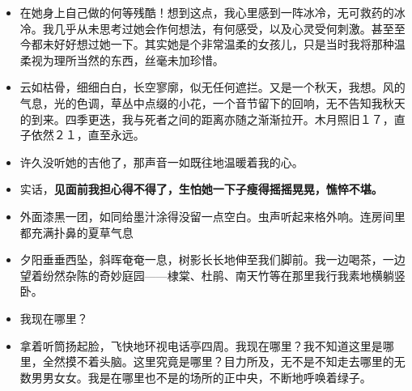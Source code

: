 \documentclass[UTF8,a4paper,8pt]{ctexart}
\begin{document}
\begin{itemize}
 	\item 在她身上自己做的何等残酷！想到这点，我心里感到一阵冰冷，无可救药的冰冷。我几乎从未思考过她会作何想法，有何感受，以及心灵受何刺激。甚至至今都未好好想过她一下。其实她是个非常温柔的女孩儿，只是当时我将那种温柔视为理所当然的东西，丝毫未加珍惜。
 	\item 云如枯骨，细细白白，长空寥廓，似无任何遮拦。又是一个秋天，我想。风的气息，光的色调，草丛中点缀的小花，一个音节留下的回响，无不告知我秋天的到来。四季更迭，我与死者之间的距离亦随之渐渐拉开。木月照旧１７，直子依然２１，直至永远。
 	\item 许久没听她的吉他了，那声音一如既往地温暖着我的心。
 	\item 实话，\textbf{见面前我担心得不得了，生怕她一下子瘦得摇摇晃晃，憔悴不堪。}
 	\item 外面漆黑一团，如同给墨汁涂得没留一点空白。虫声听起来格外响。连房间里都充满扑鼻的夏草气息
 	\item 夕阳垂垂西坠，斜晖奄奄一息，树影长长地伸至我们脚前。我一边喝茶，一边望着纷然杂陈的奇妙庭园——棣棠、杜鹃、南天竹等在那里我行我素地横躺竖卧。
 	\item 我现在哪里？
 	\item 拿着听筒扬起脸，飞快地环视电话亭四周。我现在哪里？我不知道这里是哪里，全然摸不着头脑。这里究竟是哪里？目力所及，无不是不知走去哪里的无数男男女女。我是在哪里也不是的场所的正中央，不断地呼唤着绿子。
 \end{itemize}
 \newpage
\end{document}
